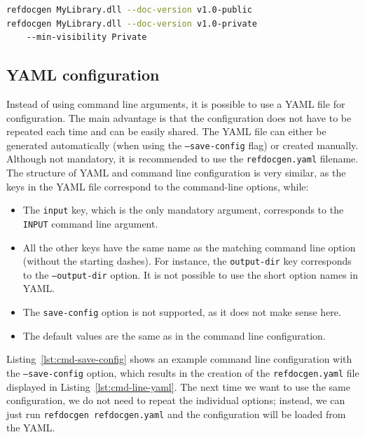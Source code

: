 \begin{listing}[H]
\begin{lstlisting}[language=bash]
refdocgen MyLibrary.dll --doc-version v1.0-public
refdocgen MyLibrary.dll --doc-version v1.0-private 
    --min-visibility Private
\end{lstlisting}
\caption{Creating both public and private API of a library}
\label{lst:user-docs-versions2}
\end{listing}

\subsection{YAML configuration}
\label{sec:user-docs-yaml}

Instead of using command line arguments, it is possible to use a YAML file for configuration.
The main advantage is that the configuration does not have to be repeated each time and can be easily shared.
The YAML file can either be generated automatically (when using the \texttt{--save-config} flag) or created manually.
Although not mandatory, it is recommended to use the \texttt{refdocgen.yaml} filename.
The structure of YAML and command line configuration is very similar, as the keys in the YAML file correspond to the command-line options, while:

\begin{itemize}
    \item The \texttt{input} key, which is the only mandatory argument, corresponds to the \texttt{INPUT} command line argument.
    \item All the other keys have the same name as the matching command line option (without the starting dashes). For instance, the \texttt{output-dir} key corresponds to the \texttt{--output-dir} option. 
    It is not possible to use the short option names in YAML.
    \item The \texttt{save-config} option is not supported, as it does not make sense here.
    \item The default values are the same as in the command line configuration.
\end{itemize}

Listing~\ref{lst:cmd-save-config} shows an example command line configuration with the \texttt{--save-config} option, which results in the creation of the \texttt{refdocgen.yaml} file displayed in Listing~\ref{lst:cmd-line-yaml}.
The next time we want to use the same configuration, we do not need to repeat the individual options; instead, we can just run \texttt{refdocgen refdocgen.yaml} and the configuration will be loaded from the YAML.

